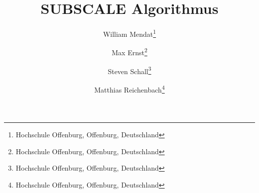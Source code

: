 \documentclass[]{lni}
\begin{document}
    \title[SUBSCALE]{SUBSCALE Algorithmus}
    \author[William Mendat \and Max Ernst \and Steven Schall \and Matthias Reichenbach]
    {William Mendat\footnote{Hochschule Offenburg, Offenburg,
        Deutschland } \and
    Max Ernst\footnote{Hochschule Offenburg, Offenburg,
        Deutschland } \and
    Steven Schall\footnote{Hochschule Offenburg, Offenburg,
        Deutschland } \and
    Matthias Reichenbach\footnote{Hochschule Offenburg, Offenburg,
        Deutschland }}
    \maketitle

    
    
    
    
    
    
    
    


\end{document}
